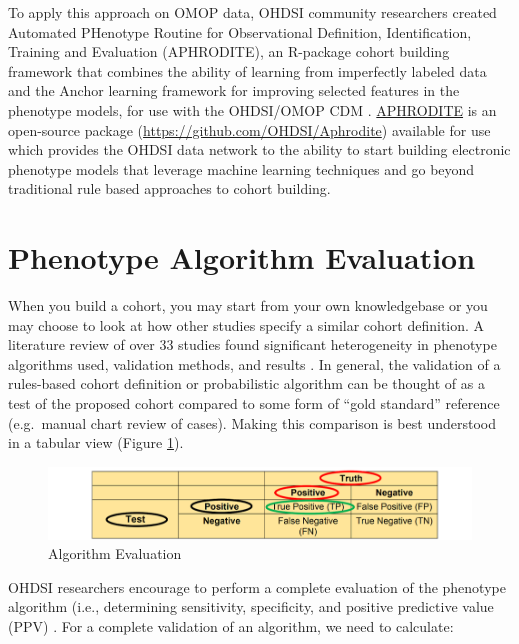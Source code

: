 \documentclass[11pt]{book}
\theoremstyle{definition}
\theoremstyle{definition}
\theoremstyle{definition}
\theoremstyle{remark}
\begin{document}
To apply this approach on OMOP data, OHDSI community researchers created Automated PHenotype Routine for Observational Definition, Identification, Training and Evaluation (APHRODITE), an R-package cohort building framework that combines the ability of learning from imperfectly labeled data and the Anchor learning framework for improving selected features in the phenotype models, for use with the OHDSI/OMOP CDM \citep{Banda2017APHRODITE}. \href{https://github.com/OHDSI/Aphrodite}{APHRODITE} is an open-source package (\url{https://github.com/OHDSI/Aphrodite}) available for use which provides the OHDSI data network to the ability to start building electronic phenotype models that leverage machine learning techniques and go beyond traditional rule based approaches to cohort building.

\hypertarget{phenotype-algorithm-evaluation}{%
\section{Phenotype Algorithm Evaluation}\label{phenotype-algorithm-evaluation}}

When you build a cohort, you may start from your own knowledgebase or you may choose to look at how other studies specify a similar cohort definition. A literature review of over 33 studies found significant heterogeneity in phenotype algorithms used, validation methods, and results \citep{Rubbo2015phenotypes}. In general, the validation of a rules-based cohort definition or probabilistic algorithm can be thought of as a test of the proposed cohort compared to some form of ``gold standard'' reference (e.g.~manual chart review of cases). Making this comparison is best understood in a tabular view (Figure \ref{fig:cohortPpv}).

\begin{figure}

{\centering \includegraphics[width=0.9\linewidth]{images/Cohorts/cohort-PPV} 

}

\caption{Algorithm Evaluation}\label{fig:cohortPpv}
\end{figure}

OHDSI researchers encourage to perform a complete evaluation of the phenotype algorithm (i.e., determining sensitivity, specificity, and positive predictive value (PPV) \citep{Swerdel2019phevaluator}. For a complete validation of an algorithm, we need to calculate:
\end{document}
